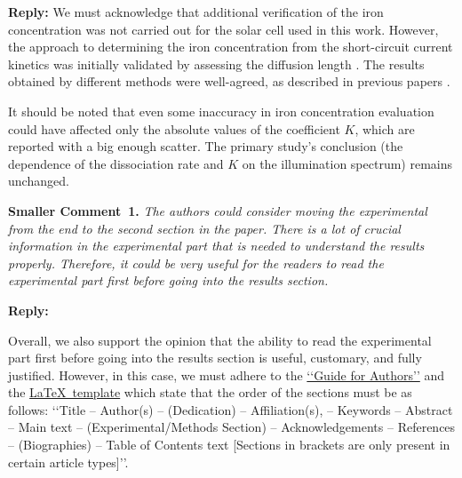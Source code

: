 \documentclass{WileyMSP-template}
\begin{document}
\noindent
\textcolor[rgb]{0.51,0.00,0.00}{\textbf{Reply:}}
We must acknowledge that additional verification of the iron concentration was not carried out for the solar cell used in this work.
However, the approach to determining the iron concentration from the short-circuit current kinetics
was initially validated by assessing the diffusion length \cite{FeB_Zong}.
The results obtained by different methods were well-agreed, as described in previous papers \cite{Olikh2021JAP,Olikh2022:JMatSci}.

It should be noted that even some inaccuracy in iron concentration evaluation could have affected only
the absolute values of the coefficient $K$, which are reported \cite{FeBLight2,FeBAssJAP2014,FeBKin2019} with a big enough scatter.
The primary study's conclusion (the dependence of the dissociation rate and $K$ on the illumination spectrum) remains unchanged.




\vspace{1cm}
\noindent
\textcolor[rgb]{0.00,0.50,1.00}{\textbf{Smaller Comment~1.}}
\emph{The authors could consider moving the experimental from the end to the second section in the paper.
There is a lot of crucial information in the experimental part that is needed to understand the results properly.
Therefore, it could be very useful for the readers to read the experimental part first before going into the results section.}

\noindent
\textcolor[rgb]{0.51,0.00,0.00}{\textbf{Reply:}}

Overall, we also support the opinion that the ability to read the experimental part first
before going into the results section is useful, customary, and fully justified.
However, in this case, we must adhere to the
\href{https://onlinelibrary.wiley.com/page/journal/18626319/homepage/author-guidelines}{‘‘Guide for Authors’’}
and the
\href{https://onlinelibrary.wiley.com/pb-assets/assets/vch/msp/LaTeX-template-1593698612150.zip}{\LaTeX~template}
which state that the order of the sections must be as follows:
‘‘Title -- Author(s) -- (Dedication) -- Affiliation(s), -- Keywords --
Abstract -- Main text -- (Experimental/Methods Section) -- Acknowledgements -- References -- (Biographies) -- Table of Contents text
 [Sections in brackets are only present in certain article types]’’.
\end{document}
